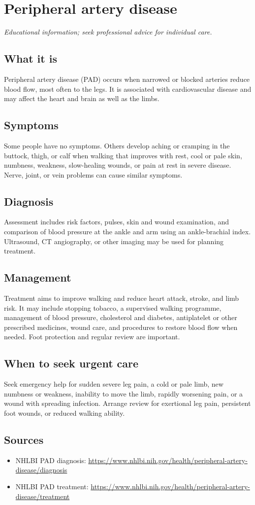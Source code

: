 \chapter{Peripheral artery disease}

\medskip
\noindent\textit{Educational information; seek professional advice for individual care.}

\section*{What it is}
Peripheral artery disease (PAD) occurs when narrowed or blocked arteries reduce blood flow, most often to the legs. It is associated with cardiovascular disease and may affect the heart and brain as well as the limbs.

\section*{Symptoms}
Some people have no symptoms. Others develop aching or cramping in the buttock, thigh, or calf when walking that improves with rest, cool or pale skin, numbness, weakness, slow-healing wounds, or pain at rest in severe disease. Nerve, joint, or vein problems can cause similar symptoms.

\section*{Diagnosis}
Assessment includes risk factors, pulses, skin and wound examination, and comparison of blood pressure at the ankle and arm using an ankle-brachial index. Ultrasound, CT angiography, or other imaging may be used for planning treatment.

\section*{Management}
Treatment aims to improve walking and reduce heart attack, stroke, and limb risk. It may include stopping tobacco, a supervised walking programme, management of blood pressure, cholesterol and diabetes, antiplatelet or other prescribed medicines, wound care, and procedures to restore blood flow when needed. Foot protection and regular review are important.

\section*{When to seek urgent care}
Seek emergency help for sudden severe leg pain, a cold or pale limb, new numbness or weakness, inability to move the limb, rapidly worsening pain, or a wound with spreading infection. Arrange review for exertional leg pain, persistent foot wounds, or reduced walking ability.

\section*{Sources}
\begin{itemize}
\item NHLBI PAD diagnosis: \url{https://www.nhlbi.nih.gov/health/peripheral-artery-disease/diagnosis}
\item NHLBI PAD treatment: \url{https://www.nhlbi.nih.gov/health/peripheral-artery-disease/treatment}
\end{itemize}
